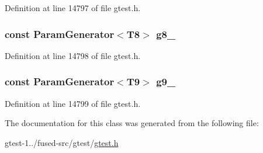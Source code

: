 \-Definition at line 14797 of file gtest.\-h.

\hypertarget{classtesting_1_1internal_1_1CartesianProductGenerator9_afbac9ea419b43f592302c2d32cc25209}{
\subsubsection[{g8\-\_\-}]{\setlength{\rightskip}{0pt plus 5cm}const {\bf \-Param\-Generator}$<$\-T8$>$ {\bf g8\-\_\-}}}\label{de/ddb/classtesting_1_1internal_1_1CartesianProductGenerator9_afbac9ea419b43f592302c2d32cc25209}


\-Definition at line 14798 of file gtest.\-h.

\hypertarget{classtesting_1_1internal_1_1CartesianProductGenerator9_ac17a9d4be4bd621acb6910365beacf60}{
\subsubsection[{g9\-\_\-}]{\setlength{\rightskip}{0pt plus 5cm}const {\bf \-Param\-Generator}$<$\-T9$>$ {\bf g9\-\_\-}}}\label{de/ddb/classtesting_1_1internal_1_1CartesianProductGenerator9_ac17a9d4be4bd621acb6910365beacf60}


\-Definition at line 14799 of file gtest.\-h.



\-The documentation for this class was generated from the following file\-:\begin{DoxyCompactItemize}
\item 
gtest-\/1../fused-\/src/gtest/\hyperlink{fused-src_2gtest_2gtest_8h}{gtest.\-h}\end{DoxyCompactItemize}
